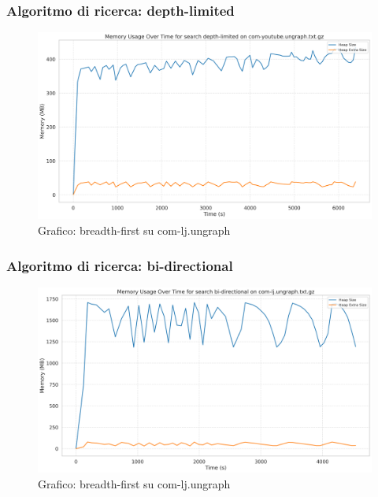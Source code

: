 \documentclass{article}
\begin{document}
\subsubsection{Algoritmo di ricerca: depth-limited}
\begin{figure}[h]\centering
\includegraphics[width=\textwidth]{../plots/com-youtube.ungraph_depth-limited.png}
\caption{Grafico: breadth-first su com-lj.ungraph}
\end{figure}
\subsubsection{Algoritmo di ricerca: bi-directional}
\begin{figure}[h]\centering
\includegraphics[width=\textwidth]{../plots/com-lj.ungraph_bi-directional.png}
\caption{Grafico: breadth-first su com-lj.ungraph}
\end{figure}
\end{document}
